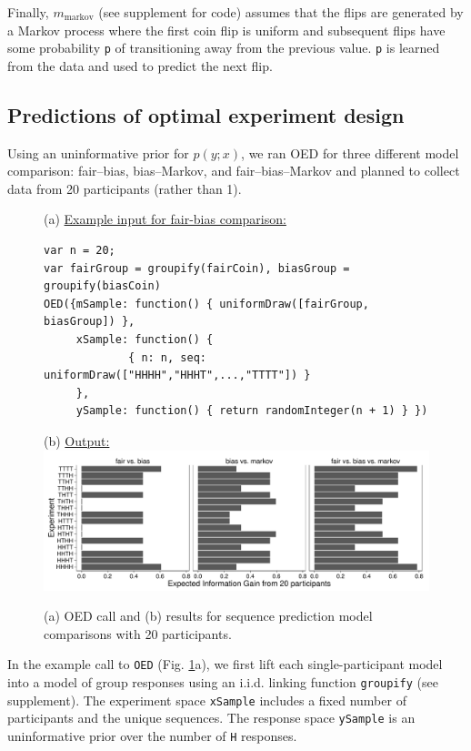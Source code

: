 \documentclass{article}
\begin{document}
Finally, $m_{\text{markov}}$ (see supplement for code) assumes that the flips are generated by a Markov process where the first coin flip is uniform and subsequent flips have some probability \lstinline{p} of transitioning away from the previous value.
\lstinline{p} is learned from the data and used to predict the next flip.


\subsection{Predictions of optimal experiment design}

Using an uninformative prior for $p(y; x)$, we ran OED for three different model comparison: fair--bias, bias--Markov, and fair--bias--Markov and planned to collect data from 20 participants (rather than 1).
\begin{figure}[t]
(a) \underline{\textsf{Example input for fair-bias comparison:}}
\begin{lstlisting}
var n = 20;
var fairGroup = groupify(fairCoin), biasGroup = groupify(biasCoin)
OED({mSample: function() { uniformDraw([fairGroup, biasGroup]) },
     xSample: function() {
    		 { n: n, seq: uniformDraw(["HHHH","HHHT",...,"TTTT"]) }
   	 },
     ySample: function() { return randomInteger(n + 1) } })
\end{lstlisting}
(b) \underline{\textsf{Output:}}\\
\includegraphics[width=\columnwidth]{img/coin_eig_n20_ignorance.pdf}
\caption{(a) OED call and (b) results for sequence prediction model comparisons with 20 participants.}
\label{fig:run-coin}
\end{figure}


In the example call to \lstinline{OED} (Fig. \ref{fig:run-coin}a), we first lift each single-participant model into a model of group responses using an i.i.d. linking function \lstinline{groupify} (see supplement).
The experiment space \lstinline{xSample} includes a fixed number of participants and the unique sequences.
The response space \lstinline{ySample} is an uninformative prior over the number of \lstinline{H} responses.
\end{document}
